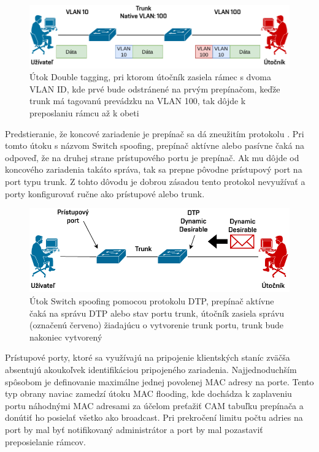\begin{figure}[H]
	\begin{center}
		\includegraphics[scale=0.75]{obrazky/double-tagging.pdf}
	\end{center}
	\caption[VLAN Hopping s Double Tagging]{Útok Double tagging, pri ktorom útočník zasiela rámec s dvoma VLAN ID, kde prvé bude odstránené na prvým prepínačom, keďže trunk má tagovanú prevádzku na VLAN 100, tak dôjde k preposlaniu rámcu až k obeti \cite{srOo9OPXJxHjPBgo}}
	\label{fig:double-tagging}
\end{figure} 

Predstieranie, že koncové zariadenie je prepínač sa dá zneužitím protokolu  \cite{uYLsMtQInofenpV3}. Pri tomto útoku s názvom Switch spoofing, prepínač aktívne alebo pasívne čaká na odpoveď, že na druhej strane prístupového portu je prepínač. Ak mu dôjde od koncového zariadenia takáto správa, tak sa prepne pôvodne prístupový port na port typu trunk. Z tohto dôvodu je dobrou zásadou tento protokol nevyužívať a porty konfigurovať ručne ako prístupové alebo trunk.

\begin{figure}[H]
	\begin{center}
		\includegraphics[scale=0.75]{obrazky/switch-spoofing.pdf}
	\end{center}
	\caption[Útok Switch spoofing pomocou protokolu DTP]{Útok Switch spoofing pomocou protokolu DTP, prepínač aktívne čaká na správu DTP alebo stav portu trunk, útočník zasiela správu (označenú červeno) žiadajúcu o vytvorenie trunk portu, trunk bude nakoniec vytvorený}
	\label{fig:switch-spoofing}
\end{figure} 

Prístupové porty, ktoré sa využívajú na pripojenie klientských staníc zväčša absentujú akoukoľvek identifikáciou pripojeného zariadenia. Najjednoduchším spôsobom je definovanie maximálne jednej povolenej MAC adresy na porte. Tento typ obrany naviac zamedzí útoku MAC flooding, kde dochádza k zaplaveniu portu náhodnými MAC adresami za účelom preťažiť CAM tabuľku prepínača a donútiť ho posielať všetko ako broadcast. Pri prekročení limitu počtu adries na port by mal byť notifikovaný administrátor a port by mal pozastaviť preposielanie rámcov.

